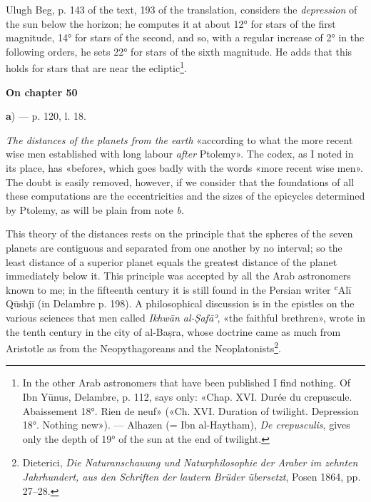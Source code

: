 \documentclass[11pt]{article}
\newcommand{\UnitHead}[2]{\par\setcounter{footnoteT}{0}\needspace{8\baselineskip}\bigskip\pdfbookmark[1]{#1}{unit-#2}\hypertarget{EN-#2}{}%
 {\large\bfseries\interlinepenalty=10000 #1\par}\nobreak\medskip}
\begin{document}
\par Ulugh Beg, p. 143 of the text, 193 of the translation, considers the \emph{depression} of the sun below the horizon; he computes it at about 12° for stars of the first magnitude, 14° for stars of the second, and so, with a regular increase of 2° in the following orders, he sets 22° for stars of the sixth magnitude. He adds that this holds for stars that are near the ecliptic\footnote{In the other Arab astronomers that have been published I find nothing. Of Ibn Yūnus, Delambre, p. 112, says only: «Chap. XVI. Durée du crepuscule. Abaissement 18°. Rien de neuf» («Ch. XVI. Duration of twilight. Depression 18°. Nothing new»). — Alhazen (= Ibn al-Haytham), \emph{De crepusculis}, gives only the depth of 19° of the sun at the end of twilight.}.\par
\UnitHead{On chapter 50}{A50}
\par\begin{center}\textbf{a}) — p. 120, l. 18.\end{center}
\par \emph{The distances of the planets from the earth} «according to what the more recent wise men established with long labour \emph{after} Ptolemy». The codex, as I noted in its place, has «before», which goes badly with the words «more recent wise men». The doubt is easily removed, however, if we consider that the foundations of all these computations are the eccentricities and the sizes of the epicycles determined by Ptolemy, as will be plain from note \emph{b}.\par
\par This theory of the distances rests on the principle that the spheres of the seven planets are contiguous and separated from one another by no interval; so the least distance of a superior planet equals the greatest distance of the planet immediately below it. This principle was accepted by all the Arab astronomers known to me; in the fifteenth century it is still found in the Persian writer ʿAlī Qūshjī (in Delambre p. 198). A philosophical discussion is in the epistles on the various sciences that men called \emph{Ikhwān al-Ṣafāʾ}, «the faithful brethren», wrote in the tenth century in the city of al-Baṣra, whose doctrine came as much from Aristotle as from the Neopythagoreans and the Neoplatonists\footnote{Dieterici, \emph{Die Naturanschauung und Naturphilosophie der Araber im zehnten Jahrhundert, aus den Schriften der lautern Brüder übersetzt}, Posen 1864, pp. 27–28.}.\par
\end{document}
